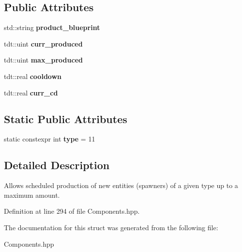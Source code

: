 \subsection*{Public Attributes}
\begin{DoxyCompactItemize}
\item 
std\+::string {\bfseries product\+\_\+blueprint}\hypertarget{struct_production_component_ae0880bbbc20032b4d1182630190d7b62}{}\label{struct_production_component_ae0880bbbc20032b4d1182630190d7b62}

\item 
tdt\+::uint {\bfseries curr\+\_\+produced}\hypertarget{struct_production_component_adaf8a9fa51936b32a352314fa2e524ad}{}\label{struct_production_component_adaf8a9fa51936b32a352314fa2e524ad}

\item 
tdt\+::uint {\bfseries max\+\_\+produced}\hypertarget{struct_production_component_a96d04bf54602b9efcc891ad22cdae1be}{}\label{struct_production_component_a96d04bf54602b9efcc891ad22cdae1be}

\item 
tdt\+::real {\bfseries cooldown}\hypertarget{struct_production_component_ae2e97e438f56b14a3db1f27257d65373}{}\label{struct_production_component_ae2e97e438f56b14a3db1f27257d65373}

\item 
tdt\+::real {\bfseries curr\+\_\+cd}\hypertarget{struct_production_component_af27b0ff0455756914c1f82133d8ca14c}{}\label{struct_production_component_af27b0ff0455756914c1f82133d8ca14c}

\end{DoxyCompactItemize}
\subsection*{Static Public Attributes}
\begin{DoxyCompactItemize}
\item 
static constexpr int {\bfseries type} = 11\hypertarget{struct_production_component_a318238033df2b0daf7a43e777760c6fb}{}\label{struct_production_component_a318238033df2b0daf7a43e777760c6fb}

\end{DoxyCompactItemize}


\subsection{Detailed Description}
Allows scheduled production of new entities (spawners) of a given type up to a maximum amount. 

Definition at line 294 of file Components.\+hpp.



The documentation for this struct was generated from the following file\+:\begin{DoxyCompactItemize}
\item 
Components.\+hpp\end{DoxyCompactItemize}

